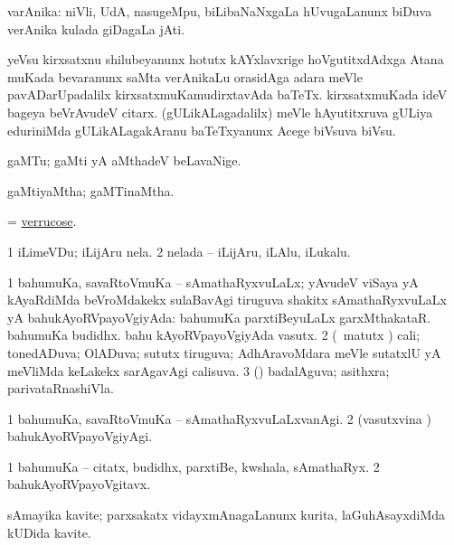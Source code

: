 \bentry
{} 
\gl{\nA}
\expl{}
\bmng
 varAnika: 
\banum
{} niVli, UdA, nasugeMpu, biLibaNaNxgaLa hUvugaLanunx biDuva verAnika kulada giDagaLa jAti. 
\hypertarget{veronica(b)}{} 
 yeVsu kirxsatxnu shilubeyanunx hotutx kAYxlavxrige hoVgutitxdAdxga Atana muKada bevaranunx saMta verAnikaLu orasidAga adara meVle pavADarUpadalilx kirxsatxmuKamudirxtavAda baTeTx. 
 kirxsatxmuKada ideV bageya beVrAvudeV citarx. 
 (gULikALagadalilx) meVle hAyutitxruva gULiya eduriniMda gULikALagakAranu baTeTxyanunx Acege biVsuva biVsu. 
\eanum
\emng
\eentry

\bentry
{} 
\gl{\nA}
\bmng
 gaMTu; gaMti yA aMthadeV beLavaNige. 
\emng
\eentry

\bentry
{} 
\gl{\gu}
\expl{}
\bmng
 gaMtiyaMtha; gaMTinaMtha. 
\emng
\eentry

\bentry
{} 
\gl{\gu}
\expl{}
\bmng
 = \hyperlink{verrucose}{verrucose}. 
\emng
\eentry

\bentry 
{} 
\gl{\nA}
\expl{}
\bmng
\bnum
\num{1} iLimeVDu; iLijAru nela. 
\num{2} nelada -- iLijAru, iLAlu, iLukalu. 
\enum
\emng
\eentry

\bentry
{} 
\gl{\gu}
\expl{}
\bmng
\bnum
\num{1} bahumuKa, savaRtoVmuKa -- sAmathaRyxvuLaLx; yAvudeV viSaya yA kAyaRdiMda beVroMdakekx sulaBavAgi tiruguva shakitx sAmathaRyxvuLaLx yA bahukAyoRVpayoVgiyAda:  bahumuKa parxtiBeyuLaLx garxMthakataR.  bahumuKa budidhx.  bahu kAyoRVpayoVgiyAda vasutx. 
\num{2} (\pArxvi\ matutx \savi) cali; tonedADuva; OlADuva; sututx tiruguva; AdhAravoMdara meVle sutatxlU yA meVliMda keLakekx sarAgavAgi calisuva. 
\num{3} (\pArxparx) badalAguva; asithxra; parivataRnashiVla. 
\enum
\emng
\eentry

\bentry 
{} 
\gl{\kirxvi}
\expl{}
\bmng
\bnum
\num{1} bahumuKa, savaRtoVmuKa -- sAmathaRyxvuLaLxvanAgi. 
\num{2} (vasutxvina \vi) bahukAyoRVpayoVgiyAgi. 
\enum
\emng
\eentry

\bentry
{} 
\gl{\nA}
\expl{}
\bmng
\bnum
\num{1} bahumuKa -- citatx, budidhx, parxtiBe, kwshala, sAmathaRyx. 
\num{2} bahukAyoRVpayoVgitavx. 
\enum
\emng
\eentry

\bentry
{} 
\gl{\nA}
\expl{\F}
\bmng
 sAmayika kavite; parxsakatx vidayxmAnagaLanunx kurita, laGuhAsayxdiMda kUDida kavite. 
\emng
\eentry

